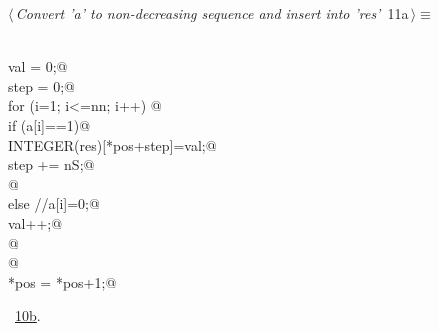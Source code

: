 \documentclass[reqno]{amsart}
\renewcommand{\NWtarget}[2]{\hypertarget{#1}{#2}}
\renewcommand{\NWlink}[2]{\hyperlink{#1}{#2}}
\begin{document}
\begin{flushleft} \small
\begin{minipage}{\linewidth}\label{scrap13}\raggedright\small
\NWtarget{nuweb11a}{} $\langle\,${\itshape Convert 'a' to non-decreasing sequence and insert into 'res'}\nobreak\ {\footnotesize {11a}}$\,\rangle\equiv$
\vspace{-1ex}
\begin{list}{}{} \item
\mbox{}\verb@@\\
\mbox{}\verb@                val = 0;@\\
\mbox{}\verb@                step = 0;@\\
\mbox{}\verb@                for (i=1; i<=nn; i++) {@\\
\mbox{}\verb@                        if (a[i]==1){@\\
\mbox{}\verb@                                INTEGER(res)[*pos+step]=val;@\\
\mbox{}\verb@                                step += nS;@\\
\mbox{}\verb@                        }@\\
\mbox{}\verb@                        else { //a[i]=0;@\\
\mbox{}\verb@                                val++;@\\
\mbox{}\verb@                        }@\\
\mbox{}\verb@                }@\\
\mbox{}\verb@            *pos = *pos+1;@\\
\mbox{}\verb@@{\NWsep}
\end{list}
\vspace{-1.5ex}
\footnotesize
\begin{list}{}{\setlength{\itemsep}{-\parsep}\setlength{\itemindent}{-\leftmargin}}
\item \NWtxtMacroRefIn\ \NWlink{nuweb10b}{10b}.

\item{}
\end{list}
\end{minipage}\vspace{4ex}
\end{flushleft}
\end{document}
